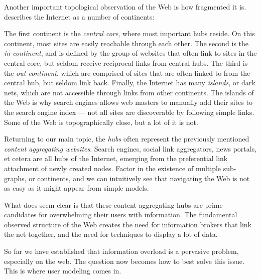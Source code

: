 \vspace{1em}
\noindent
Another important topological observation of the Web is how fragmented it is. 
\citet[p166]{Barabasi2003} describes the Internet as a number of continents:

The first continent is the \emph{central core}, where most important hubs reside. On this continent, most sites are easily reachable through each other.
The second is the \emph{in-continent}, and is defined by the group of websites that often link to sites in the central core, but seldom receive reciprocal links from central hubs.
The third is the \emph{out-continent}, which are comprised of sites that are often linked to from the central hub, but seldom link back.
Finally, the Internet has many \emph{islands}, or dark nets, which are not accessible through links from other continents. 
The islands of the Web is why search engines allows web masters to manually add their sites to the search engine index --- not all sites are discoverable by following simple links. Some of the Web is topographically close, but a lot of it is not.

Returning to our main topic, the \emph{hubs} often represent the previously mentioned \emph{content aggregating websites}. 
Search engines, social link aggregators, news portals, et cetera are all hubs of the Internet, emerging from the preferential 
link attachment of newly created nodes. 
Factor in the existence of multiple sub-graphs, or continents, and we can intuitively see that navigating the Web is not as 
easy as it might appear from simple models.

What does seem clear is that these content aggregating hubs are prime candidates for overwhelming their users with information. 
The fundamental observed structure of the Web creates the need for information brokers that link the net together, 
and the need for techniques to display a lot of data. 

So far we have established that information overload is a pervasive problem, especially on the web.
The question now becomes how to best solve this issue. 
This is where user modeling comes in.


